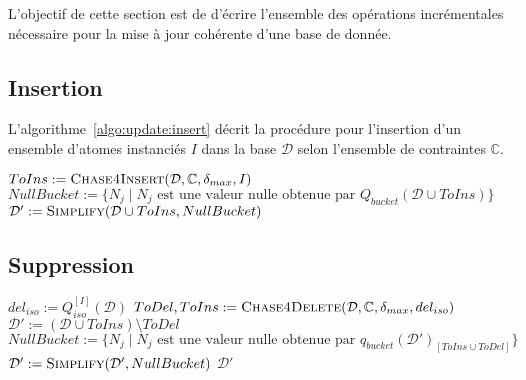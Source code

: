 L'objectif de cette section est de d'écrire l'ensemble des opérations incrémentales nécessaire pour la mise à jour cohérente d'une base de donnée.

\subsection{Insertion}
\label{sec:update:insert}
L'algorithme~\ref{algo:update:insert} décrit la procédure pour l'insertion d'un ensemble d'atomes instanciés $I$ dans la base $\mathcal{D}$ selon l'ensemble de contraintes $\mathbb{C}$.


\begin{algorithm}[ht]
    \caption{$\textsc{Insert}(\mathcal{D}, \mathbb{C}, \delta_{max}, I)$}
    \label{algo:update:insert}
	$ToIns := \textsc{Chase4Insert}(\mathcal{D}, \mathbb{C}, \delta_{max}, I)$ \;
    $NullBucket := \{N_j \mid N_j \text{ est une valeur nulle obtenue par } Q_{bucket}(\mathcal{D} \cup ToIns)\}$ \;
    $\mathcal{D}' := \textsc{Simplify}(\mathcal{D} \cup ToIns, NullBucket)$ \;
\end{algorithm}

\subsection{Suppression}
\label{sec:update:delete}

\begin{algorithm}[ht]
	\caption{$\textsc{Delete}(\mathcal{D}, \mathbb{C}, \delta_{max}, I)$}
    \label{algo:update:delete}
	$del_{iso} := Q_{iso}^{[I]}(\mathcal{D})$ \;
	$ToDel, ToIns := \textsc{Chase4Delete} (\mathcal{D}, \mathbb{C}, \delta_{max}, del_{iso})$\;
	$\mathcal{D}' := (\mathcal{D} \cup ToIns) \setminus ToDel$ \;
	$NullBucket := \{N_j \mid N_j \text{ est une valeur nulle obtenue par } q_{bucket}(\mathcal{D}')_{[ToIns \cup ToDel]}\}$ \;
	$\mathcal{D}' := \textsc{Simplify}(\mathcal{D}', NullBucket)$ \;
	\Return $\mathcal{D}'$
\end{algorithm}

